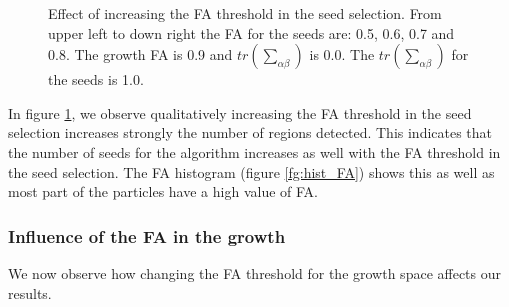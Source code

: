 \documentclass[12pt]{article}
\begin{document}
\begin{figure}[ht]
\begin{minipage}{.45\textwidth}
\end{minipage}
\caption{Effect of increasing the FA threshold in the seed selection. From upper left to down right the FA for the seeds are: 0.5, 0.6, 0.7 and 0.8. The growth FA is 0.9 and $tr \left(\sum_{\alpha\beta}\right)$ is 0.0. The $tr \left(\sum_{\alpha\beta}\right)$ for the seeds is 1.0.} \label{fg:3D_FA_seeds}
\end{figure}
\FloatBarrier

\begin{par}
In figure \ref{fg:3D_FA_seeds}, we observe qualitatively
 increasing the FA threshold in the seed selection
  increases strongly the number of regions detected. This
   indicates that the number of seeds for the algorithm
    increases as well with the FA threshold in the seed
    selection. The FA histogram (figure \ref{fg:hist_FA})
     shows this as well as most part of the particles
      have a high value of FA.
\end{par}


\subsubsection{Influence of the FA in the growth}
\label{sec:infl_FA_growth}
\begin{par}
We now observe how changing the FA threshold
 for the growth space affects our results. 
\end{par}
\end{document}
